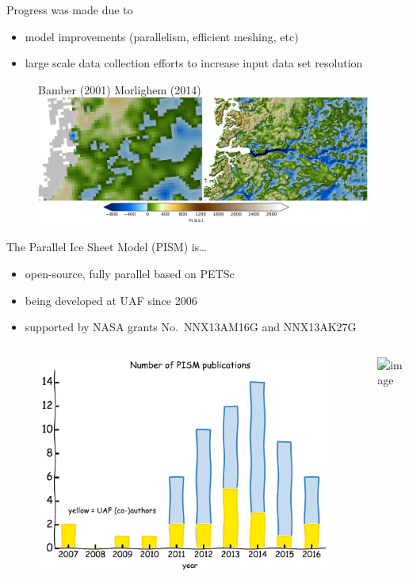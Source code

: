 \documentclass[hide notes,intlimits]{beamer}
\begin{document}
\begin{frame}
  \begin{block}{Progress was made due to}
    \begin{itemize}
    \item model improvements (parallelism, efficient meshing, etc)
    \item large scale data collection efforts to increase input data set resolution
    \end{itemize}
  \end{block}
  \begin{figure}
    \small{Bamber (2001) \hspace{5em} Morlighem (2014)}
    \includegraphics[width=11cm]{jako_bed}
 \end{figure}
\end{frame}


\begin{frame}{The Parallel Ice Sheet Model (PISM) is\ldots}
  \begin{itemize}
  \item open-source, fully parallel based on PETSc
  \item being developed at UAF since 2006
  \item supported by NASA grants No.~NNX13AM16G and  NNX13AK27G
  \end{itemize}
  \begin{columns}
    \column[c]{4.75cm}
    \begin{figure}
      \includegraphics[width=\textwidth]{pism-uaf-publications}
    \end{figure}
    \column[c]{6.25cm}
    \includegraphics<1>[width=\textwidth]{pism-users}
  \end{columns}
\end{frame}
\end{document}
